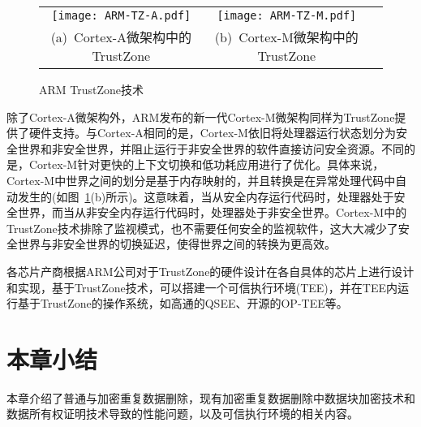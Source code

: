 \begin{figure}[!htb]
    \small
    \centering
    \begin{tabular}{@{}c@{}c@{}c}
        \texttt{[image: ARM-TZ-A.pdf]} &
        \hspace{5pt}
        \texttt{[image: ARM-TZ-M.pdf]}   \\
        \mbox{\small (a) Cortex-A微架构中的TrustZone}        &
        \mbox{\small (b) Cortex-M微架构中的TrustZone}          \\
    \end{tabular}
    \caption{ARM TrustZone技术}
    \label{fig:ARM-TZ-base}
\end{figure}

除了Cortex-A微架构外，ARM发布的新一代Cortex-M微架构\cite{cortex-m}同样为TrustZone提供了硬件支持。与Cortex-A相同的是，Cortex-M依旧将处理器运行状态划分为安全世界和非安全世界，并阻止运行于非安全世界的软件直接访问安全资源。不同的是，Cortex-M针对更快的上下文切换和低功耗应用进行了优化。具体来说，Cortex-M中世界之间的划分是基于内存映射的，并且转换是在异常处理代码中自动发生的(如图~\ref{fig:ARM-TZ-base}(b)所示)。这意味着，当从安全内存运行代码时，处理器处于安全世界，而当从非安全内存运行代码时，处理器处于非安全世界。Cortex-M中的TrustZone技术排除了监视模式，也不需要任何安全的监视软件，这大大减少了安全世界与非安全世界的切换延迟，使得世界之间的转换为更高效。

各芯片产商根据ARM公司对于TrustZone的硬件设计在各自具体的芯片上进行设计和实现，基于TrustZone技术，可以搭建一个可信执行环境(TEE)，并在TEE内运行基于TrustZone的操作系统，如高通的QSEE、开源的OP-TEE等。

\section{本章小结}

本章介绍了普通与加密重复数据删除，现有加密重复数据删除中数据块加密技术和数据所有权证明技术导致的性能问题，以及可信执行环境的相关内容。

